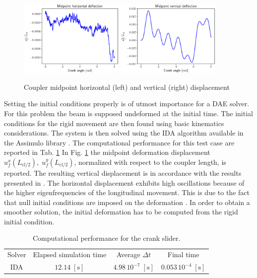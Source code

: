 \documentclass{svjour3}                     %
\newcommand{\secondRev}[1]{\textcolor{blue!80!black}{#1}}
\begin{document}
\begin{figure}[tb]
	\centering
	\includegraphics[width=0.45\textwidth]{uM_disp.eps} 
	\includegraphics[width=0.45\textwidth]{wM_disp.eps} 
	\caption{Coupler midpoint horizontal (left) and vertical (right) displacement}
	\label{fig:defM_crsl}
\end{figure}

Setting the initial conditions properly is of utmost  importance for a DAE solver. For this problem the beam is supposed undeformed at the initial time. The initial conditions for the rigid movement are then found using basic kinematics considerations.  The system is then solved using the IDA algorithm available in the Assimulo library \cite{assimulo}. \secondRev{The computational performance for this test case are reported in Tab. \ref{tab:comp_perf_crslider}} In Fig. \ref{fig:defM_crsl} the midpoint deformation displacement $u_f^x(L_{\text{cl}/2}),\; u_f^y(L_{\text{cl}/2})$, normalized with respect to the coupler length, is reported. The resulting vertical displacement is in accordance with the results presented in \cite{Ellenbroek2018}. The horizontal displacement exhibits high oscillations because of the higher eigenfrequencies of the longitudinal movement. This is due to the fact that null initial conditions are imposed on the deformation \cite{MB_Daepde}. In order to obtain a smoother solution, the initial deformation has to be computed from the rigid initial condition.


\begin{table}[tb]
	\caption{\secondRev{Computational performance for the crank slider.}}
	\label{tab:comp_perf_crslider}       %
	\begin{tabular}{cccc}
		\hline\noalign{\smallskip}
		Solver & Elapsed simulation time & Average $\Delta t$ & Final time \\
		\noalign{\smallskip}\hline\noalign{\smallskip}
		IDA & $12.14\; \mathrm{[s]}$ & $4.98 \, 10^{-7} \; \mathrm{[s]}$ & $0.053 \, 10^{-4} \; \mathrm{[s]}$\\
		\hline
	\end{tabular}
\end{table}
\end{document}
